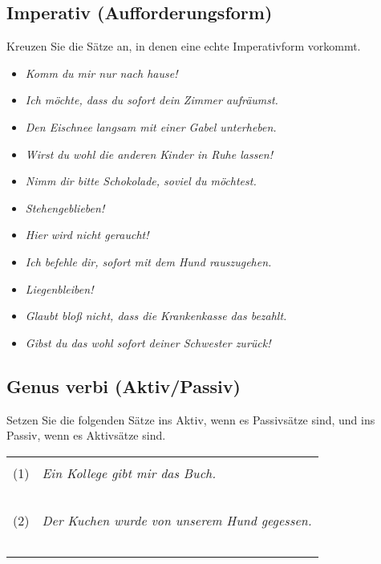 \documentclass[12pt,a4paper,twoside]{article}
\newcommand{\gruen}[1]{\textcolor{gruen}{#1}}
\newcommand{\morphologieaufgabe}{}
\newcommand{\FUBreak}{\clearpage}
\newcommand{\morphologieaufgabe}{\textbf{\gruen{Morphologie-Seminar}}\ |\ }
\newcommand{\FUBreak}{}
\newcommand{\Lf}{
  \setlength{\itemsep}{1pt}
  \setlength{\parskip}{0pt}
  \setlength{\parsep}{0pt}
}
\begin{document}
\begin{ignorable}
\subsection{\morphologieaufgabe Imperativ (Aufforderungsform)}

Kreuzen Sie die Sätze an, in denen eine echte Imperativform vorkommt.

\begin{itemize}[label=\Square]\Lf
  \item \textit{Komm du mir nur nach hause!}
  \item \textit{Ich möchte, dass du sofort dein Zimmer aufräumst.}
  \item \textit{Den Eischnee langsam mit einer Gabel unterheben.}
  \item \textit{Wirst du wohl die anderen Kinder in Ruhe lassen!}
  \item \textit{Nimm dir bitte Schokolade, soviel du möchtest.}
  \item \textit{Stehengeblieben!}
  \item \textit{Hier wird nicht geraucht!}
  \item \textit{Ich befehle dir, sofort mit dem Hund rauszugehen.}
  \item \textit{Liegenbleiben!}
  \item \textit{Glaubt bloß nicht, dass die Krankenkasse das bezahlt.}
  \item \textit{Gibst du das wohl sofort deiner Schwester zurück!}
\end{itemize}

\end{ignorable}

\FUBreak

\subsection{\morphologieaufgabe Genus verbi (Aktiv\slash Passiv)}

Setzen Sie die folgenden Sätze ins Aktiv, wenn es Passivsätze sind, und ins Passiv, wenn es Aktivsätze sind.

\begin{center}
  \begin{tabular}[h]{cp{}}
    & \\
    (1) & \textit{Ein Kollege gibt mir das Buch.} \\
    & \\
    &\\\cline{2-2}
    & \\
    &\\\cline{2-2}
    & \\
    (2) & \textit{Der Kuchen wurde von unserem Hund gegessen.} \\
    & \\
    &\\\cline{2-2}
    & \\
    &\\\cline{2-2}
    & \\
  \end{tabular}
\end{center}
\end{document}
